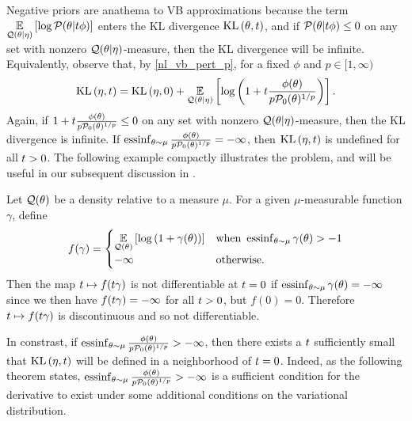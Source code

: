 Negative priors are anathema to VB approximations because the term
$\underset{\mathcal{Q}(\theta \vert \eta)}{\mathbb{E}}\left[\log \mathcal{P}(\theta \vert t \phi)\right]$ enters the KL
divergence $\mathrm{KL}\left(\theta, t\right)$, and if $\mathcal{P}(\theta \vert t \phi) \le 0$ on any set
with nonzero $\mathcal{Q}(\theta \vert \eta)$-measure, then the KL divergence will be
infinite.  Equivalently, observe that, by \eqref{nl_vb_pert_p}, for a fixed
$\phi$ and $p \in [1, \infty)$
%
\begin{align*}
%
\KL{\eta, \t} = \KL{\eta, 0} +
\expect{\q(\theta \vert \eta)}
       {\log\left(1 + \t \frac{\phi(\theta)}{p \pbase(\theta)^{1/p}}\right)}.
%
\end{align*}
%
Again, if $1 + t \frac{\phi(\theta)}{p \mathcal{P}_{0}(\theta)^{1/p}} \le 0$ on any set
with nonzero $\mathcal{Q}(\theta \vert \eta)$-measure, then the KL divergence is
infinite.  If $\operatorname*{\mathrm{essinf}}_{\theta \sim \mu}\frac{\phi(\theta)}{p
\mathcal{P}_{0}(\theta)^{1/p}} = -\infty$, then $\mathrm{KL}\left(\eta, t\right)$ is undefined for all $t >
0$.  The following example compactly illustrates the problem, and will be useful
in our subsequent discussion in .

\begin{ex}
%
Let $\mathcal{Q}(\theta)$ be a density relative to a measure $\mu$. For a given
$\mu$-measurable function $\gamma$, define
%
\begin{align*}
%
f(\gamma) = \begin{cases}
\expect{\q(\theta)}{\log\left(1 + \gamma(\theta)\right)}
    & \textrm{when }\essinf_{\theta \sim \mu} \gamma(\theta) > -1 \\
-\infty & \textrm{otherwise}.
\end{cases}
%
\end{align*}
%
Then the map $t \mapsto f(t \gamma)$ is not differentiable at $t=0$ if
$\operatorname*{\mathrm{essinf}}_{\theta \sim \mu} \gamma(\theta) = -\infty$ since we then have $f (t
\gamma) = -\infty$ for all $t > 0$, but $f(0) = 0$.  Therefore $t \mapsto f(t
\gamma)$ is discontinuous and so not differentiable.
%
\end{ex}

In constrast, if $\operatorname*{\mathrm{essinf}}_{\theta \sim \mu}\frac{\phi(\theta)}{p
\mathcal{P}_{0}(\theta)^{1/p}} > -\infty$, then there exists a $t$ sufficiently small
that $\mathrm{KL}\left(\eta, t\right)$ will be defined in a neighborhood of $t = 0$. Indeed, as
the following theorem states, $\operatorname*{\mathrm{essinf}}_{\theta \sim
\mu}\frac{\phi(\theta)}{p \mathcal{P}_{0}(\theta)^{1/p}} > -\infty$ is a sufficient
condition for the derivative to exist under some additional conditions on the
variational distribution.

